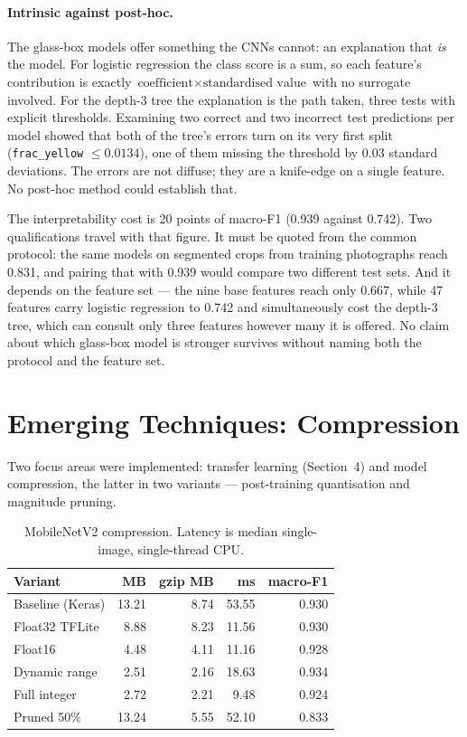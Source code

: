 \documentclass[sigconf,nonacm]{acmart}
\begin{document}
\paragraph{Intrinsic against post-hoc.} The glass-box models offer something the
CNNs cannot: an explanation that \emph{is} the model. For logistic regression the
class score is a sum, so each feature's contribution is exactly
$\text{coefficient} \times \text{standardised value}$ with no surrogate involved.
For the depth-3 tree the explanation is the path taken, three tests with explicit
thresholds. Examining two correct and two incorrect test predictions per model
showed that both of the tree's errors turn on its very first split
(\texttt{frac\_yellow} $\leq 0.0134$), one of them missing the threshold by 0.03
standard deviations. The errors are not diffuse; they are a knife-edge on a
single feature. No post-hoc method could establish that.

The interpretability cost is 20 points of macro-F1 (0.939 against 0.742). Two
qualifications travel with that figure. It must be quoted from the common
protocol: the same models on segmented crops from training photographs reach
0.831, and pairing that with 0.939 would compare two different test sets. And it
depends on the feature set --- the nine base features reach only 0.667, while 47
features carry logistic regression to 0.742 and simultaneously cost the depth-3
tree, which can consult only three features however many it is offered. No claim
about which glass-box model is stronger survives without naming both the protocol
and the feature set.

\section{Emerging Techniques: Compression}
\label{sec:compression}

Two focus areas were implemented: transfer learning (Section~4) and model
compression, the latter in two variants --- post-training quantisation and
magnitude pruning.

\begin{table}[t]
\caption{MobileNetV2 compression. Latency is median single-image, single-thread
CPU.}
\label{tab:compression}
\begin{tabular}{lrrrr}
\toprule
Variant & MB & gzip MB & ms & macro-F1 \\
\midrule
Baseline (Keras)  & 13.21 & 8.74 & 53.55 & 0.930 \\
Float32 TFLite    &  8.88 & 8.23 & 11.56 & 0.930 \\
Float16           &  4.48 & 4.11 & 11.16 & 0.928 \\
Dynamic range     &  2.51 & 2.16 & 18.63 & 0.934 \\
Full integer      &  2.72 & 2.21 &  9.48 & 0.924 \\
Pruned 50\%       & 13.24 & 5.55 & 52.10 & 0.833 \\
\bottomrule
\end{tabular}
\end{table}
\end{document}
